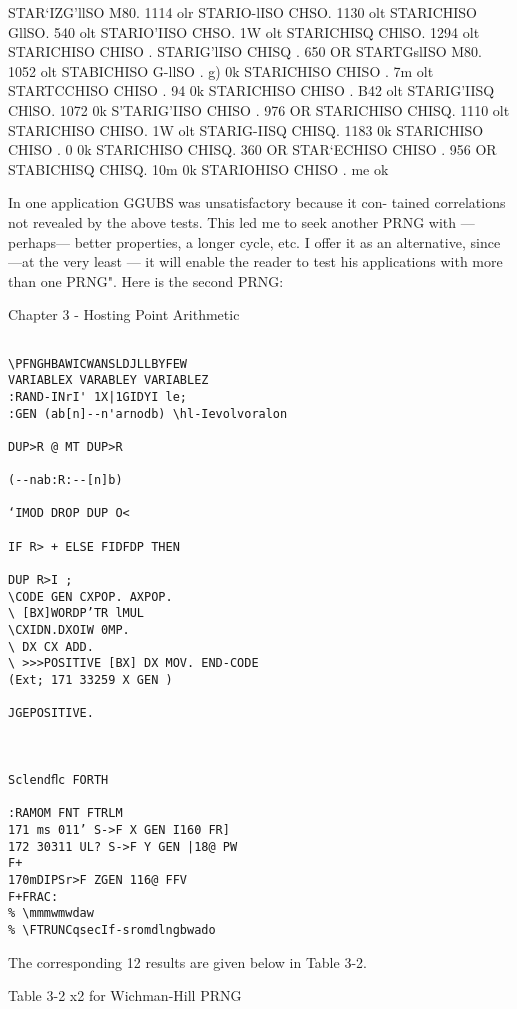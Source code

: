  

STAR‘IZG'llSO M80. 1114 olr STARIO-lISO CHSO. 1130 olt
STARICHISO GllSO. 540 olt STARIO'IISO CHSO. 1W olt
STARICHISQ CHlSO. 1294 olt STARICHISO CHISO . %
STARIG'lISO CHISQ . 650 OR STARTGslISO M80. 1052 olt
STABICHISO G-llSO . g) 0k STARICHISO CHISO . 7m olt
STARTCCHISO CHISO . 94 0k STARICHISO CHISO . B42 olt
STARIG'IISQ CHlSO. 1072 0k S'TARIG'IISO CHISO . 976 OR
STARICHISO CHISQ. 1110 olt STARICHISO CHISO. 1W olt
STARIG-IISQ CHISQ. 1183 0k STARICHISO CHISO . $0$ 0k
STARICHISO CHISQ. 360 OR STAR‘ECHISO CHISO . 956 OR
STABICHISQ CHISQ. 10m 0k STARIOHISO CHISO . me ok

 

 

 

In one application GGUBS was unsatisfactory because it con-
tained correlations not revealed by the above tests. This led me
to seek another PRNG with —perhaps— better properties, a
longer cycle, etc. I offer it as an alternative, since —at the very
least — it will enable the reader to test his applications with more
than one PRNG". Here is the second PRNG:

Chapter 3 - Hosting Point Arithmetic
\begin{verbatim}

\PFNGHBAWICWANSLDJLLBYFEW
VARIABLEX VARABLEY VARIABLEZ
:RAND-INrI' 1X|1GIDYI le;
:GEN (ab[n]--n'arnodb) \hl-Ievolvoralon

DUP>R @ MT DUP>R

(--nab:R:--[n]b)

‘IMOD DROP DUP O<

IF R> + ELSE FIDFDP THEN

DUP R>I ;
\CODE GEN CXPOP. AXPOP.
\ [BX]WORDP’TR lMUL
\CXIDN.DXOIW 0MP.
\ DX CX ADD.
\ >>>POSITIVE [BX] DX MOV. END-CODE
(Ext; 171 33259 X GEN )

JGEPOSITIVE.

 

Sclendﬂc FORTH

:RAMOM FNT FTRLM
171 ms 011’ S->F X GEN I160 FR]
172 30311 UL? S->F Y GEN |18@ PW
F+
170mDIPSr>F ZGEN 116@ FFV
F+FRAC:
% \mmmwmwdaw
% \FTRUNCqsecIf-sromdlngbwado
\end{verbatim}
The corresponding 12 results are given below in Table 3-2.

Table 3-2 x2 for Wichman-Hill PRNG


